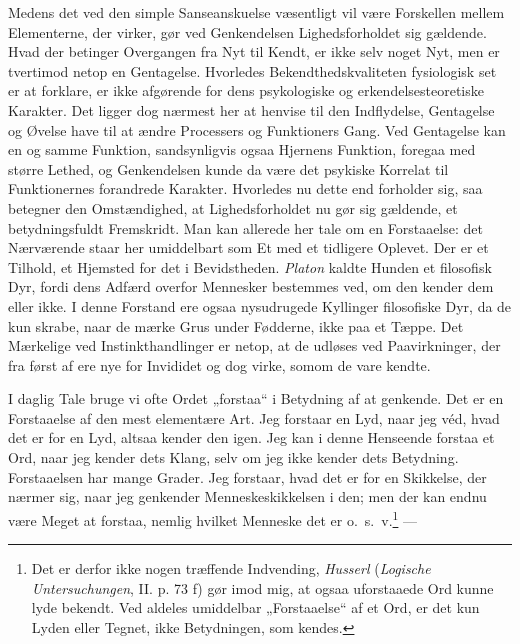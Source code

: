\documentclass[12pt,a4paper]{book}
\newcommand{\opage}[1]{\marginnote{\footnotesize\textit{[#1]}}}
\begin{document}
Medens det ved den simple Sanseanskuelse væsentligt vil være Forskellen
mellem Elementerne, der virker, gør ved Genkendelsen Lighedsforholdet sig
gældende. Hvad der betinger Overgangen fra Nyt til Kendt, er ikke selv
noget Nyt, men er tvertimod netop en Gentagelse. Hvorledes
Bekendthedskvaliteten fysiologisk set er at forklare, er ikke afgørende
for dens psykologiske og erkendelsesteoretiske Karakter. Det ligger dog
nærmest her at henvise til den Indflydelse, Gentagelse og Øvelse have til
at ændre Processers og Funktioners Gang. Ved Gentagelse kan en og samme
Funktion, sandsynligvis ogsaa Hjernens Funktion, foregaa med større
Lethed, og Genkendelsen kunde da være det psykiske Korrelat til
Funktionernes forandrede Karakter. Hvorledes nu dette end forholder sig,
saa betegner den Omstændighed, at Lighedsforholdet nu gør sig gældende,
et betydningsfuldt Fremskridt. Man kan allerede her tale om en
Forstaaelse: det Nærværende staar her umiddelbart som Et med et tidligere
Oplevet. Der er et Tilhold, et Hjemsted for det i
\opage{48}Bevidstheden.
\emph{Platon} kaldte Hunden et filosofisk Dyr, fordi dens Adfærd overfor
Mennesker bestemmes ved, om den kender dem eller ikke. I denne Forstand
ere ogsaa nysudrugede Kyllinger filosofiske Dyr, da de kun skrabe, naar
de mærke Grus under Fødderne, ikke paa et Tæppe. Det Mærkelige ved
Instinkthandlinger er netop, at de udløses ved Paavirkninger, der fra
først af ere nye for Invididet og dog virke, somom de vare kendte.

I daglig Tale bruge vi ofte Ordet „forstaa“ i Betydning af at genkende.
Det er en Forstaaelse af den mest elementære Art. Jeg forstaar en Lyd,
naar jeg véd, hvad det er for en Lyd, altsaa kender den igen. Jeg kan i
denne Henseende forstaa et Ord, naar jeg kender dets Klang, selv om jeg
ikke kender dets Betydning. Forstaaelsen har mange Grader. Jeg forstaar,
hvad det er for en Skikkelse, der nærmer sig, naar jeg genkender
Menneskeskikkelsen i den; men der kan endnu være Meget at forstaa,
nemlig hvilket Menneske det er o.\ s.\ v.\footnote{Det er derfor ikke
nogen træffende Indvending, \emph{Husserl} (\emph{Logische
Untersuchungen}, II. p. 73 f) gør imod mig, at ogsaa uforstaaede Ord
kunne lyde bekendt. Ved aldeles umiddelbar „Forstaaelse“ af et Ord, er
det kun Lyden eller Tegnet, ikke Betydningen, som kendes.} ---
\end{document}
